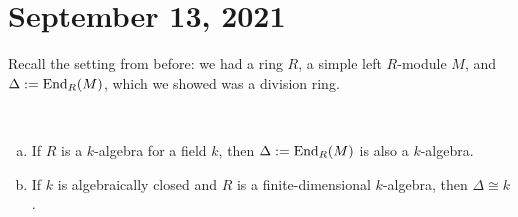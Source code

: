 \section{September 13, 2021}
Recall the setting from before: we had a ring $R$, a simple left $R$-module $M$,
and $\Delta := \operatorname{End}_R(M)$, which we showed was a division ring. 

\begin{prop}~
\begin{enumerate}[(a)]
    \item If $R$ is a $k$-algebra for a field $k$, then $\Delta := \operatorname{End}_R(M)$ is also a $k$-algebra. 
    \item If $k$ is algebraically closed and $R$ is a finite-dimensional $k$-algebra, then $\Delta 
    \cong k$. 
\end{enumerate}
\end{prop}

